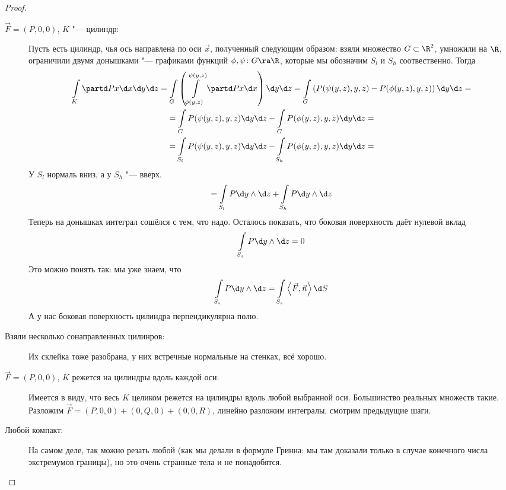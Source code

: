 \begin{proof}\begin{description}
\item[$\vec F = (P, 0, 0)$, $K$ "--- цилиндр:]
	Пусть есть цилиндр, чья ось направлена по оси $\vec x$, полученный следующим образом:
	взяли множество $G \subset \R^2$, умножили на $\R$, ограничили двумя донышками "--- графиками функций $\phi, \psi\colon G \ra \R$,
	которые мы обозначим $S_l$ и $S_h$ соотвественно.
	Тогда
	\begin{gather*}
		\int\limits_K \partd Px \d x \d y \d z
		= \int\limits_G \left( \int\limits_{\phi(y,z)}^{\psi(y,z)} \partd Px \d x\right) \d y \d z
		= \int\limits_G \left( P(\psi(y,z), y, z) - P(\phi(y,z), y, z) \right) \d y \d z = \\
		= \int\limits_G P(\psi(y,z), y, z) \d y \d z - \int\limits_G P(\phi(y,z), y, z) \d y \d z = \\
		= \int\limits_{S_l} P(\psi(y,z), y, z) \d y \d z - \int\limits_{S_h} P(\phi(y,z), y, z) \d y \d z =
	\end{gather*}
	У $S_l$ нормаль вниз, а у $S_h$ "--- вверх.
	\begin{gather*}
		= \int\limits_{S_l} P \d y \wedge \d z + \int\limits_{S_h} P \d y \wedge \d z
	\end{gather*}
	Теперь на донышках интеграл сошёлся с тем, что надо.
	Осталось показать, что боковая поверхность даёт нулевой вклад
	\[ \int\limits_{S_s} P \d y \wedge \d z = 0 \]
	Это можно понять так: мы уже знаем, что
	\[ \int\limits_{S_s} P \d y \wedge \d z = \int\limits_{S_s} \left<\vec F, \vec n\right> \d S \]
	А у нас боковая поверхность цилиндра перпендикулярна полю.

\item[Взяли несколько сонаправленных цилинров:]
	Их склейка тоже разобрана, у них встречные нормальные на стенках, всё хорошо.

\item[$\vec F = (P, 0, 0)$, $K$ режется на цилиндры вдоль каждой оси:]
	Имеется в виду, что весь $K$ целиком режется на цилиндры вдоль любой выбранной оси.
	Большинство реальных множеств такие.
	Разложим $\vec F = (P, 0, 0) + (0, Q, 0) + (0, 0, R)$, линейно разложим интегралы, смотрим предыдущие шаги.

\item[Любой компакт:]
	На самом деле, так можно резать любой (как мы делали в формуле Гринна: мы там доказали только в случае конечного числа экстремумов границы),
	но это очень странные тела и не понадобятся.
\end{description}\end{proof}

